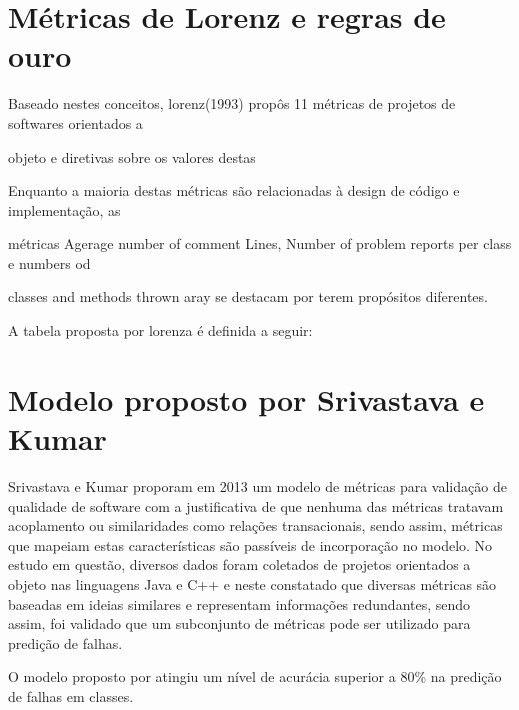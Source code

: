 \documentclass[
	12pt,				%
	oneside,			%
	a4paper,			%
	english,			%
	brazil				%
	]{abntex2ppgsi}
\begin{document}
\section{Métricas de Lorenz e regras de ouro}






Baseado nestes conceitos, lorenz(1993) propôs 11 métricas de projetos de softwares orientados a

objeto e diretivas sobre os valores destas

Enquanto a maioria destas métricas são relacionadas à design de código e implementação, as

métricas Agerage number of comment Lines, Number of problem reports per class e numbers od

classes and methods thrown aray se destacam por terem propósitos diferentes.

A tabela proposta por lorenza é definida a seguir:


\section{Modelo proposto por Srivastava e Kumar}

Srivastava e Kumar proporam em 2013 um modelo de métricas para validação de qualidade de software com a justificativa de que nenhuma das métricas tratavam acoplamento ou similaridades como relações transacionais, sendo assim, métricas que mapeiam estas características são passíveis de incorporação no modelo. No estudo em questão, diversos dados foram coletados de projetos orientados a objeto nas linguagens Java e C++ e neste constatado que diversas métricas são baseadas em ideias similares e representam informações redundantes, sendo assim, foi validado que um subconjunto de métricas pode ser utilizado para predição de falhas.

O modelo proposto por \cite{srivastava2013} atingiu um nível de acurácia superior a 80\% na predição de falhas em classes.
\end{document}
